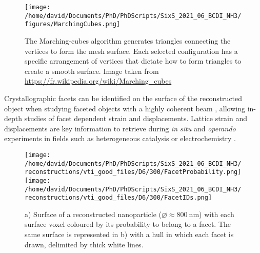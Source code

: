 \begin{figure}[!htb]
    \centering
    \texttt{[image: /home/david/Documents/PhD/PhDScripts/SixS\_2021\_06\_BCDI\_NH3/figures/MarchingCubes.png]}
    \caption{
    The Marching-cubes algorithm generates triangles connecting the vertices to form the mesh surface.
    Each selected configuration has a specific arrangement of vertices that dictate how to form triangles to create a smooth surface.
    Image taken from \url{https://fr.wikipedia.org/wiki/Marching_cubes}
    }
    \label{fig:MarchingCubes}
\end{figure}

Crystallographic facets can be identified on the surface of the reconstructed object when studying faceted objects with a highly coherent beam \parencite{Richard2018}, allowing in-depth studies of facet dependent strain and displacements.
Lattice strain and displacements are key information to retrieve during \textit{in situ} and \textit{operando} experiments in fields such as heterogeneous catalysis \parencite{Ulvestad2016, Yau2017a, Kim2018, Fernandez2019, Abuin2019, Kim2019, Kawaguchi2019, Suzana2019, Choi2020, Passos2020,  Kim2021, Carnis2021, Dupraz2022} or electrochemistry \parencite{Ulvestad2015a, Bjorling2019, Vicente2021, Kawaguchi2021, Carnis2021b, Atlan2023}.

\begin{figure}
    \centering
    \texttt{[image: /home/david/Documents/PhD/PhDScripts/SixS\_2021\_06\_BCDI\_NH3/reconstructions/vti\_good\_files/D6/300/FacetProbability.png]}
    \texttt{[image: /home/david/Documents/PhD/PhDScripts/SixS\_2021\_06\_BCDI\_NH3/reconstructions/vti\_good\_files/D6/300/FacetIDs.png]}
    \caption{
    a) Surface of a reconstructed nanoparticle ($\diameter \approx \qty{800}{\nm}$) with each surface voxel coloured by its probability to belong to a facet.
    The same surface is represented in b) with a hull in which each facet is drawn, delimited by thick white lines.
    }
    \label{fig:FacetsParaview}
\end{figure}

